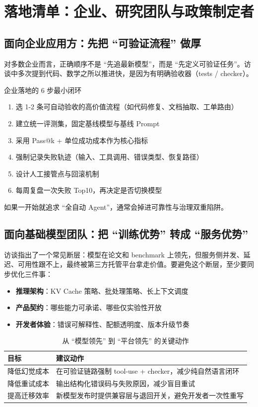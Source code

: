 \section{落地清单：企业、研究团队与政策制定者}

\subsection{面向企业应用方：先把 ``可验证流程'' 做厚}

对多数企业而言，正确顺序不是 ``先追最新模型''，而是 ``先定义可验证任务''。访谈中多次提到代码、数学之所以推进快，是因为有明确验收器（tests / checker）。

\begin{importantbox}{企业落地的 6 步最小闭环}
\begin{enumerate}
    \item 选 1-2 条可自动验收的高价值流程（如代码修复、文档抽取、工单路由）
    \item 建立统一评测集，固定基线模型与基线 Prompt
    \item 采用 Pass@k + 单位成功成本作为核心指标
    \item 强制记录失败轨迹（输入、工具调用、错误类型、恢复路径）
    \item 设计人工接管点与回滚机制
    \item 每周复盘一次失败 Top10，再决定是否切换模型
\end{enumerate}

如果一开始就追求 ``全自动 Agent''，通常会掉进可靠性与治理双重陷阱。
\end{importantbox}

\subsection{面向基础模型团队：把 ``训练优势'' 转成 ``服务优势''}

访谈指出了一个常见断层：模型在论文和 benchmark 上领先，但服务侧并发、延迟、可用性跟不上，最终被第三方托管平台拿走价值。要避免这个断层，至少要同步优化三件事：
\begin{itemize}
    \item \textbf{推理架构}：KV Cache 策略、批处理策略、长上下文调度
    \item \textbf{产品契约}：哪些能力可承诺、哪些仅实验性开放
    \item \textbf{开发者体验}：错误可解释性、配额透明度、版本升级节奏
\end{itemize}

\begin{table}[H]
\centering
\begin{tabular}{lp{8.5cm}}
\toprule
\textbf{目标} & \textbf{建议动作} \\
\midrule
降低幻觉成本 & 在可验证链路强制 tool-use + checker，减少纯自然语言闭环 \\
降低重试成本 & 输出结构化错误码与失败原因，减少盲目重试 \\
提高迁移效率 & 新模型发布时提供兼容层与退回开关，避免开发者一次性重写 \\
\bottomrule
\end{tabular}
\caption{从 ``模型领先'' 到 ``平台领先'' 的关键动作}
\end{table}

